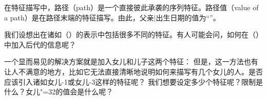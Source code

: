 在特征描写中，路径（path）是一个直接彼此承袭的序列特征。路径值（value of a path）是在路径末端的特征描写。由此，\textsc{父亲$|$出生日期}的值为“”。

我们设想出在诸如（）的表示中包括很多不同的特征。有人可能会问，如何在（）中加入后代的信息呢？

一个显而易见的解决方案就是加入\textsc{女儿}和\textsc{儿子}这两个特征：
\ea
{}
\z
但是，这一方法也有让人不满意的地方，比如它无法直接清晰地说明如何来描写有几个女儿的人。是否应该引入诸如\textsc{女儿-1}或\textsc{女儿-3}这样的特征呢？
\ea
{}
\z
我们想要设定多少个特征呢？限制是什么？\textsc{女儿"=32}的值会是什么呢？

